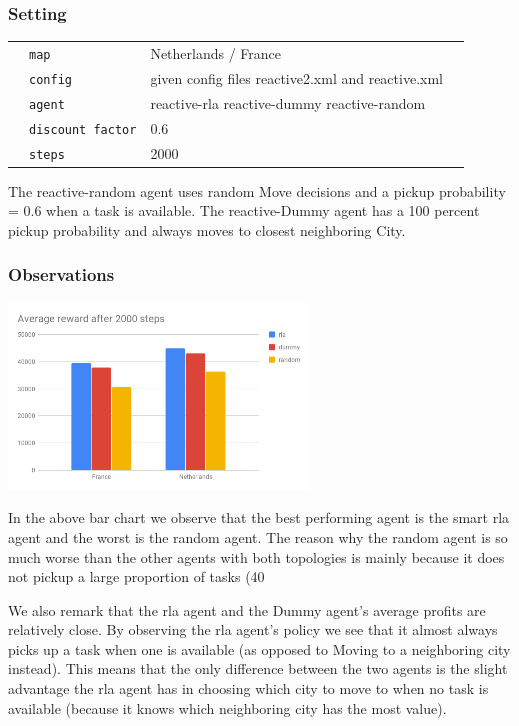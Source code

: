 \documentclass[11pt]{article}
\begin{document}
\subsubsection{Setting}
 \begin{table}[H]
  \begin{tabular}{llll}
   &\texttt{map }  &Netherlands / France\\
   &\texttt{config}  & given config files reactive2.xml and reactive.xml \\
   &\texttt{agent}  &reactive-rla reactive-dummy reactive-random\\
   &\texttt{discount factor}  &0.6\\
   &\texttt{steps}  &2000
  \end{tabular}
 \end{table}
 
 The reactive-random agent uses random Move decisions and a pickup probability = 0.6 when a task is available.
The reactive-Dummy agent has a 100 percent pickup probability and always moves to closest neighboring City.

 
\subsubsection{Observations}
 \includegraphics[width=0.6\textwidth]{agents.png}

In the above bar chart we observe that the best performing agent is the smart rla agent and the worst is the random agent. The reason why the random agent is so much worse than the other agents with both topologies is mainly because it does not pickup a large proportion of tasks (40%

We also remark that the rla agent and the Dummy agent’s average profits are relatively close. By observing the rla agent’s policy we see that it almost always picks up a task when one is available (as opposed to Moving to a neighboring city instead). This means that the only difference between the two agents is the slight advantage the rla agent has in choosing which city to move to when no task is available (because it knows which neighboring city has the most value).
\end{document}
